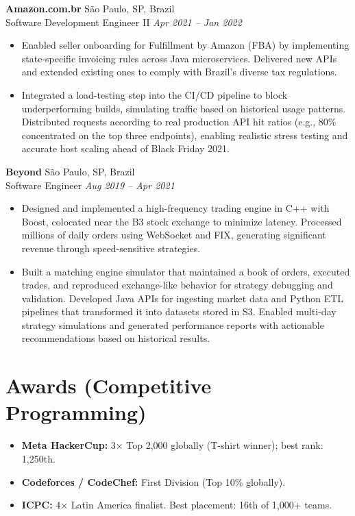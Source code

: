 \documentclass[a4paper,10pt]{article}
\begin{document}
\textbf{Amazon.com.br}
    \hfill São Paulo, SP, Brazil 
    \\ Software Development Engineer II 
    \hfill \textit{Apr 2021 – Jan 2022}
\begin{itemize}
    \item Enabled seller onboarding for Fulfillment by Amazon (FBA) by implementing state-specific invoicing rules across Java microservices. Delivered new APIs and extended existing ones to comply with Brazil’s diverse tax regulations.
    \item Integrated a load-testing step into the CI/CD pipeline to block underperforming builds, simulating traffic based on historical usage patterns. Distributed requests according to real production API hit ratios (e.g., 80\% concentrated on the top three endpoints), enabling realistic stress testing and accurate host scaling ahead of Black Friday 2021.
\end{itemize}

\textbf{Beyond}
    \hfill São Paulo, SP, Brazil 
    \\ Software Engineer
    \hfill \textit{Aug 2019 – Apr 2021}
\begin{itemize}
    \item Designed and implemented a high-frequency trading engine in C++ with Boost, colocated near the B3 stock exchange to minimize latency. Processed millions of daily orders using WebSocket and FIX, generating significant revenue through speed-sensitive strategies.
    \item Built a matching engine simulator that maintained a book of orders, executed trades, and reproduced exchange-like behavior for strategy debugging and validation. Developed Java APIs for ingesting market data and Python ETL pipelines that transformed it into datasets stored in S3. Enabled multi-day strategy simulations and generated performance reports with actionable recommendations based on historical results.
\end{itemize}

\section*{Awards (Competitive Programming)}
\begin{itemize}
    \item \textbf{Meta HackerCup:} 3× Top 2,000 globally (T-shirt winner); best rank: 1,250th.
    \item \textbf{Codeforces / CodeChef:} First Division (Top 10\% globally).
    \item \textbf{ICPC:} 4× Latin America finalist. Best placement: 16th of 1,000+ teams.
\end{itemize}
\end{document}
